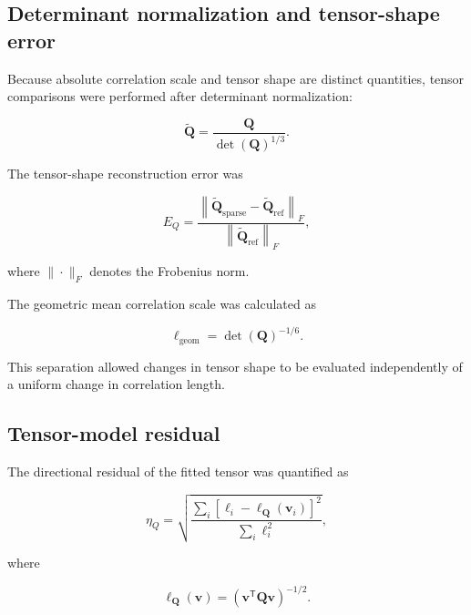 \documentclass{article}
\begin{document}
\subsection{Determinant normalization and tensor-shape error}
\label{sec:SI_error}

Because absolute correlation scale and tensor shape are distinct
quantities, tensor comparisons were performed after determinant
normalization:

\begin{equation}
    \widetilde{\mathbf{Q}}
    =
    \frac{\mathbf{Q}}
    {\det(\mathbf{Q})^{1/3}}.
    \label{eq:SI_detnorm}
\end{equation}

The tensor-shape reconstruction error was

\begin{equation}
    E_Q
    =
    \frac{
    \left\|
    \widetilde{\mathbf{Q}}_{\mathrm{sparse}}
    -
    \widetilde{\mathbf{Q}}_{\mathrm{ref}}
    \right\|_F
    }{
    \left\|
    \widetilde{\mathbf{Q}}_{\mathrm{ref}}
    \right\|_F
    },
    \label{eq:SI_EQ}
\end{equation}

where $\|\cdot\|_F$ denotes the Frobenius norm.

The geometric mean correlation scale was calculated as

\begin{equation}
    \ell_{\mathrm{geom}}
    =
    \det(\mathbf{Q})^{-1/6}.
\end{equation}

This separation allowed changes in tensor shape to be evaluated
independently of a uniform change in correlation length.

\subsection{Tensor-model residual}
\label{sec:SI_residual}

The directional residual of the fitted tensor was quantified as

\begin{equation}
    \eta_Q
    =
    \sqrt{
    \frac{
    \sum_i
    \left[
    \ell_i-
    \ell_{\mathbf{Q}}(\mathbf{v}_i)
    \right]^2
    }{
    \sum_i \ell_i^2
    }},
\end{equation}

where

\begin{equation}
    \ell_{\mathbf{Q}}(\mathbf{v})
    =
    \left(
    \mathbf{v}^{\mathsf T}
    \mathbf{Q}
    \mathbf{v}
    \right)^{-1/2}.
\end{equation}
\end{document}
